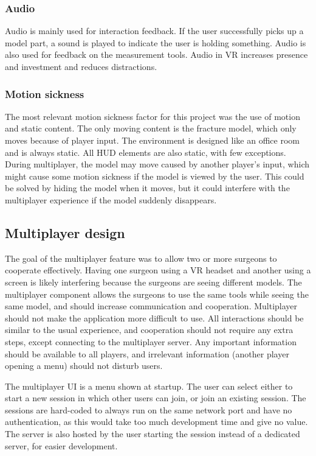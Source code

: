 \documentclass[a4paper]{report}
\begin{document}
\subsubsection{Audio}
Audio is mainly used for interaction feedback. If the user successfully picks up a model part, a sound is played to indicate the user is holding something. Audio is also used for feedback on the measurement tools. Audio in VR increases presence and investment and reduces distractions\cite{}.

\subsubsection{Motion sickness}
The most relevant motion sickness factor for this project was the use of motion and static content. The only moving content is the fracture model, which only moves because of player input. The environment is designed like an office room and is always static. All HUD elements are also static, with few exceptions.
During multiplayer, the model may move caused by another player's input, which might cause some motion sickness if the model is viewed by the user. This could be solved by hiding the model when it moves, but it could interfere with the multiplayer experience if the model suddenly disappears.

\subsection{Multiplayer design}
The goal of the multiplayer feature was to allow two or more surgeons to cooperate effectively. Having one surgeon using a VR headset and another using a screen is likely interfering because the surgeons are seeing different models. The multiplayer component allows the surgeons to use the same tools while seeing the same model, and should increase communication and cooperation.
Multiplayer should not make the application more difficult to use. All interactions should be similar to the usual experience, and cooperation should not require any extra steps, except connecting to the multiplayer server. Any important information should be available to all players, and irrelevant information (another player opening a menu) should not disturb users.

The multiplayer UI is a menu shown at startup. The user can select either to start a new session in which other users can join, or join an existing session. The sessions are hard-coded to always run on the same network port and have no authentication, as this would take too much development time and give no value. The server is also hosted by the user starting the session instead of a dedicated server, for easier development.
\end{document}
